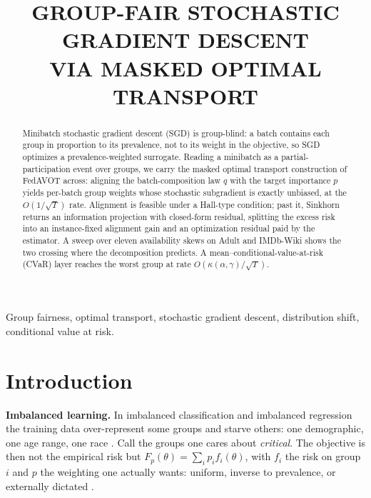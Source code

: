 \documentclass{article}
\title{GROUP-FAIR STOCHASTIC GRADIENT DESCENT \\ VIA MASKED OPTIMAL TRANSPORT}
\theoremstyle{definition}
\begin{document}
\ninept
\maketitle
\pagestyle{empty}\thispagestyle{empty}

\begin{abstract}
Minibatch stochastic gradient descent (SGD) is group-blind: a batch contains
each group in proportion to its prevalence, not to its weight in the
objective, so SGD optimizes a prevalence-weighted surrogate. Reading a
minibatch as a partial-participation event over groups, we carry the masked
optimal transport construction of \textsf{FedAVOT} across: aligning the
batch-composition law $q$ with the target importance $p$ yields per-batch
group weights whose stochastic subgradient is exactly unbiased, at the
$O(1/\sqrt{T})$ rate. Alignment is feasible under a Hall-type condition;
past it, Sinkhorn returns an information projection with closed-form
residual, splitting the excess risk into an instance-fixed alignment gain
and an optimization residual paid by the estimator. A sweep over eleven
availability skews on Adult and IMDb-Wiki shows the two crossing where the
decomposition predicts. A mean--conditional-value-at-risk (CVaR) layer
reaches the worst group at rate $O(\kappa(\alpha,\gamma)/\sqrt{T})$.
\end{abstract}

\begin{keywords}
Group fairness, optimal transport, stochastic gradient descent,
distribution shift, conditional value at risk.
\end{keywords}

\section{Introduction}

\noindent\textbf{Imbalanced learning.}
In imbalanced classification and imbalanced regression the training data
over-represent some groups and starve others: one demographic, one age range, one race \cite{buolamwini2018gender,%
hashimoto2018repeated,sagawa2020dro,yang2021dir}. Call the groups one cares
about \emph{critical}. The objective is then not the empirical risk but
$F_p(\theta)=\sum_i p_i f_i(\theta)$, with $f_i$ the risk on group $i$ and $p$
the weighting one actually wants: uniform, inverse to prevalence, or externally
dictated \cite{mohri2019agnostic,li2020fair}.
\end{document}
